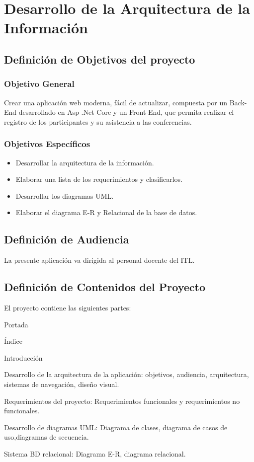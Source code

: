 \chapter{Desarrollo de la Arquitectura de la Información}

\section{Definición de Objetivos del proyecto}
\subsection{Objetivo General}

Crear una aplicación web moderna, fácil de actualizar, compuesta por un Back-End desarrollado en Asp .Net Core y un Front-End, que permita realizar el registro de los participantes y su asistencia a las conferencias.

\subsection{Objetivos Específicos}
 
\begin{itemize}
	\item Desarrollar la arquitectura de la información.
	\item Elaborar una lista de los requerimientos y clasificarlos.
	\item Desarrollar los diagramas UML.
	\item Elaborar el diagrama E-R y Relacional de la base de datos.
\end{itemize}

\section{Definición de Audiencia}
La presente aplicación va dirigida al personal docente del ITL.

\section{Definición de Contenidos del Proyecto}

El proyecto contiene las siguientes partes:

\begin{list}{--}{}
	\item Portada
	\item Índice
	\item Introducción
	\item Desarrollo de la arquitectura de la aplicación: objetivos, audiencia, arquitectura, sistemas de navegación, diseño visual.
	\item Requerimientos del proyecto: Requerimientos funcionales y requerimientos no funcionales.
	\item Desarrollo de diagramas UML: Diagrama de clases, diagrama de casos de uso,diagramas de secuencia.
	\item Sistema BD relacional: Diagrama E-R, diagrama relacional.
\end{list}

